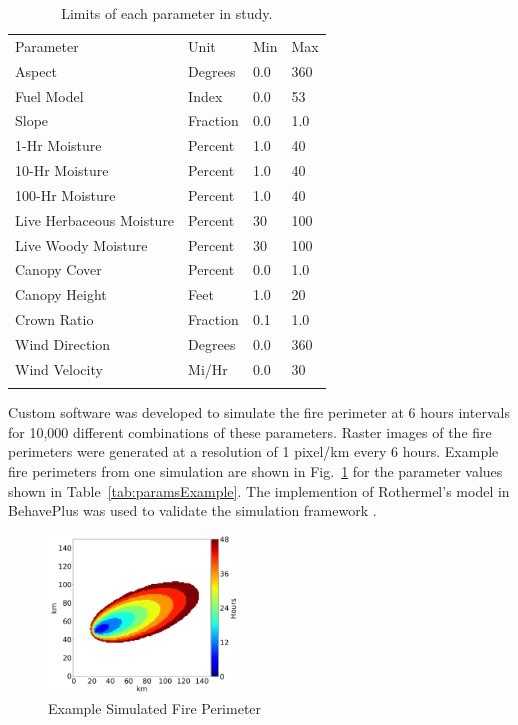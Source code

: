 \documentclass[twocolumn]{svjour3}          %
\begin{document}
\begin{table}[htb]
\centering
\caption{Limits of each parameter in study.}
\label{tab:paramsLimits}       %
\begin{tabular}{llll}
\hline\noalign{\smallskip}
Parameter & Unit & Min & Max  \\
\noalign{\smallskip}\hline\noalign{\smallskip}
Aspect & Degrees & 0.0 & 360 \\
Fuel Model & Index & 0.0 & 53 \\
Slope & Fraction & 0.0 & 1.0 \\
\hline
1-Hr Moisture & Percent & 1.0 & 40 \\
10-Hr Moisture & Percent & 1.0 & 40 \\
100-Hr Moisture & Percent & 1.0 & 40 \\
Live Herbaceous Moisture & Percent & 30 & 100 \\
Live Woody Moisture & Percent & 30 & 100 \\
\hline
Canopy Cover & Percent & 0.0 & 1.0 \\
Canopy Height & Feet & 1.0 & 20 \\
Crown Ratio & Fraction & 0.1 & 1.0 \\
\hline
Wind Direction & Degrees & 0.0 & 360 \\
Wind Velocity & Mi/Hr & 0.0 & 30 \\
\noalign{\smallskip}\hline
\end{tabular}
\end{table}

Custom software was developed
to simulate the fire perimeter at 6 hours intervals for 10,000
different combinations of these parameters. 
Raster images of the fire perimeters were generated at a resolution of
1 pixel/km every 6 hours. Example fire perimeters from one simulation
are shown in Fig.~\ref{fig:firePerimeters} for the parameter values
shown in Table~\ref{tab:paramsExample}. The implemention of
Rothermel's model in BehavePlus was used to validate the simulation
framework \cite{andrews2009behaveplus}.



\begin{figure}
\centering
  \includegraphics[width=0.45\textwidth]{exampleFirePerimiter0.png}
\caption{Example Simulated Fire Perimeter}
\label{fig:firePerimeters}       %
\end{figure}
\end{document}
